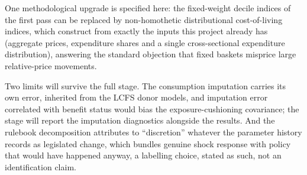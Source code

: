 One methodological upgrade is specified here: the fixed-weight decile
indices of the first pass can be replaced by non-homothetic
distributional cost-of-living indices, which \citet{hochmuth2025}
construct from exactly the inputs this project already has (aggregate
prices, expenditure shares and a single cross-sectional expenditure
distribution), answering the standard objection that fixed baskets
misprice large relative-price movements.

Two limits will survive the full stage. The consumption
imputation carries its own error, inherited from the LCFS donor
models, and imputation error correlated with benefit status would bias
the exposure-cushioning covariance; the stage will report the
imputation diagnostics alongside the results. And the rulebook
decomposition attributes to ``discretion'' whatever the parameter
history records as legislated change, which bundles genuine shock
response with policy that would have happened anyway, a labelling
choice, stated as such, not an identification claim.
